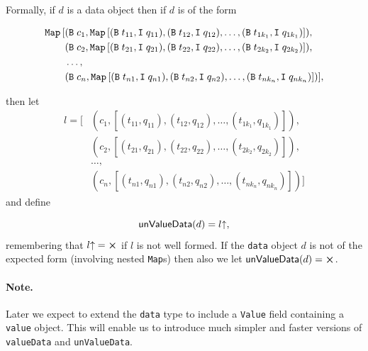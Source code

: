 \medskip
\noindent
Formally, if $d$ is a data object then if $d$ is of the form

\begin{align*}
\mathtt{Map}\,[
 &(\mathtt{B}\; c_1, \mathtt{Map}\,[(\mathtt{B}\; t_{11}, \mathtt{I}\; q_{11}), (\mathtt{B}\; t_{12}, \mathtt{I}\; q_{12}), \ldots, (\mathtt{B}\; t_{1k_1}, \mathtt{I}\; q_{1k_1})]),\\
 &(\mathtt{B}\; c_2, \mathtt{Map}\,[(\mathtt{B}\; t_{21}, \mathtt{I}\; q_{21}), (\mathtt{B}\; t_{22}, \mathtt{I}\; q_{22}), \ldots, (\mathtt{B}\; t_{2k_2}, \mathtt{I}\; q_{2k_2})]),\\
 &\ldots,\\
 &(\mathtt{B}\; c_n, \mathtt{Map}\,[(\mathtt{B}\; t_{n1}, \mathtt{I}\; q_{n1}), (\mathtt{B}\; t_{n2}, \mathtt{I}\; q_{n2}), \ldots, (\mathtt{B}\; t_{nk_n}, \mathtt{I}\; q_{nk_n})])],
\end{align*}

\noindent then let
\begin{align*}
  l = [
  &(c_1, [(t_{11}, q_{11}), (t_{12}, q_{12}), \ldots, (t_{1k_1}, q_{1k_1})]),\\
  &(c_2, [(t_{21}, q_{21}), (t_{22}, q_{22}), \ldots, (t_{2k_2}, q_{2k_2})]),\\
  &\ldots,\\
  &(c_n, [(t_{n1}, q_{n1}), (t_{n2}, q_{n2}), \ldots, (t_{nk_n}, q_{nk_n})])]
\end{align*}
\noindent and define

$$
\mathsf{unValueData}(d) = \unflatten{l},
$$
remembering that $\unflatten{l} = \errorX$ if $l$ is not well formed.
If the \texttt{data} object $d$ is not of the expected form (involving
nested \texttt{Map}s) then also we let $\mathsf{unValueData}(d) = \errorX$.

\paragraph{Note.} Later we expect to extend the \texttt{data} type to include
a \texttt{Value} field containing a \texttt{value} object.  This will enable us
to introduce much simpler and faster versions of \texttt{valueData}
and \texttt{unValueData}.
